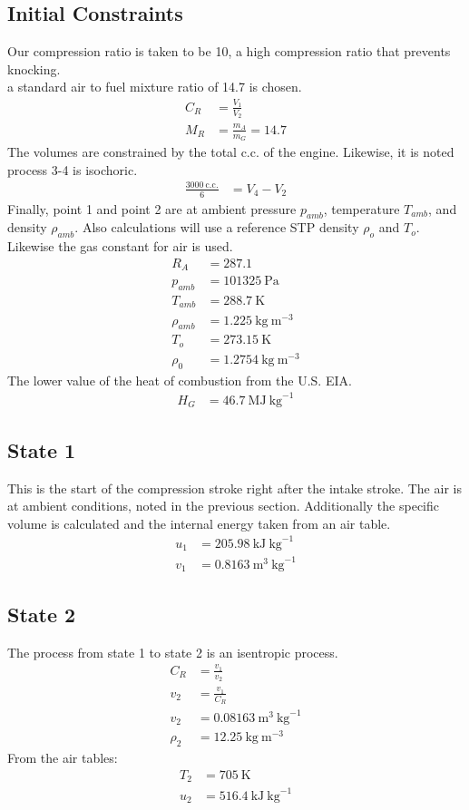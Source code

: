 \documentclass[10pt,a4paper]{article}
\begin{document}
	\subsection*{Initial Constraints}
	Our compression ratio is taken to be 10, a high compression ratio that prevents knocking. \\
	a standard air to fuel mixture ratio of 14.7 is chosen.
	\begin{align}
		C_R &= \frac{V_1}{V_2} \\
		M_R &= \frac{m_A}{m_G} = 14.7
	\end{align}
	The volumes are constrained by the total c.c. of the engine. Likewise, it is noted process 3-4 is isochoric.
	\begin{align}
		\frac{3000\ \text{c.c.}}{6} &= V_4-V_2 
	\end{align}
	Finally, point 1 and point 2 are at ambient pressure $p_{amb}$, temperature $T_{amb}$, and density $\rho_{amb}$. Also calculations will use a reference STP density $\rho_o$ and $T_o$. Likewise the gas constant for air is used.
	\begin{align}
		R_A &= 287.1 \\
		p_{amb} &= 101325\ \text{Pa} \\
		T_{amb} &= 288.7\ \text{K} \\
		\rho_{amb} &= 1.225\ \text{kg}\ \text{m}^{-3}\\
		T_o &= 273.15\ \text{K} \\
		\rho_0 &= 1.2754\ \text{kg}\ \text{m}^{-3}
	\end{align}
	The lower value of the heat of combustion from the U.S. EIA.
	\begin{align}
		H_G &= 46.7\ \text{MJ}\ \text{kg}^{-1}
	\end{align}
	\subsection*{State 1}
	This is the start of the compression stroke right after the intake stroke. The air is at ambient conditions, noted in the previous section. Additionally the specific volume is calculated and the internal energy taken from an air table.
	\begin{align}
		u_1 &= 205.98\ \text{kJ}\ \text{kg}^{-1}\\
		v_1 &= 0.8163\ \text{m}^3\ \text{kg}^{-1}
	\end{align}
	
	\subsection*{State 2}
	The process from state 1 to state 2 is an isentropic process. 
	\begin{align}
		C_R &= \frac{v_1}{v_2}\\
		v_2 &= \frac{v_1}{C_R}\\
		v_2 &= 0.08163\ \text{m}^3\ \text{kg}^{-1}\\
		\rho_2 &= 12.25\ \text{kg}\ \text{m}^{-3}
	\end{align}
	From the air tables:
	\begin{align}
		T_2 &= 705\ \text{K}\\
		u_2 &= 516.4\ \text{kJ}\ \text{kg}^{-1}
	\end{align}
\end{document}
